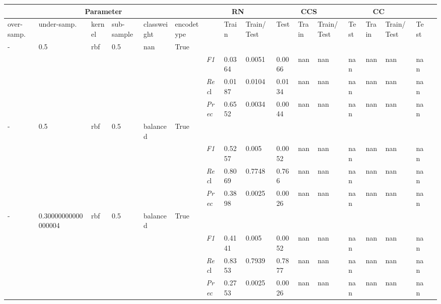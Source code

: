     \begin{table}[]
    \tiny
    \tabcolsep=0.11cm
    \begin{tabularx}{\textwidth}{XXXXXX|X|XXX|XXX|XXXX}
    \toprule
    \multicolumn{6}{c}{Parameter} & \multicolumn{3}{c}{RN} & \multicolumn{3}{c}{CCS} & \multicolumn{3}{c}{CC} \\ \midrule
    over-\newline samp. & under-\newline samp. & kernel &sub-\newline sample & class\newline weight & encode\newline type & & Train & Train/\newline Test & Test & Train & Train/\newline Test & Test & Train & Train/\newline Test & Test \\ \midrule
    - & 0.5 & rbf & 0.5 & nan &True & & & & & & & & & \\
    & & & & & & \textit{F1} & 0.0364 & 0.0051 & 0.0066 & nan & nan        & nan        & nan        & nan        & nan        \\
    & & & & & & \textit{Rec}l & 0.0187 & 0.0104 & 0.0134    & nan & nan    & nan    & nan    & nan    & nan    \\
    & & & & & & \textit{Prec} & 0.6552 & 0.0034 & 0.0044 & nan & nan & nan & nan & nan & nan \\ \midrule
    - & 0.5 & rbf & 0.5 & balanced &True & & & & & & & & & \\
    & & & & & & \textit{F1} & 0.5257 & 0.005 & 0.0052 & nan & nan        & nan        & nan        & nan        & nan        \\
    & & & & & & \textit{Rec}l & 0.8069 & 0.7748 & 0.766    & nan & nan    & nan    & nan    & nan    & nan    \\
    & & & & & & \textit{Prec} & 0.3898 & 0.0025 & 0.0026 & nan & nan & nan & nan & nan & nan \\ \midrule
    - & 0.30000000000000004 & rbf & 0.5 & balanced &True & & & & & & & & & \\
    & & & & & & \textit{F1} & 0.4141 & 0.005 & 0.0052 & nan & nan        & nan        & nan        & nan        & nan        \\
    & & & & & & \textit{Rec}l & 0.8353 & 0.7939 & 0.7877    & nan & nan    & nan    & nan    & nan    & nan    \\
    & & & & & & \textit{Prec} & 0.2753 & 0.0025 & 0.0026 & nan & nan & nan & nan & nan & nan \\ \midrule

\end{tabularx}
\end{table}
